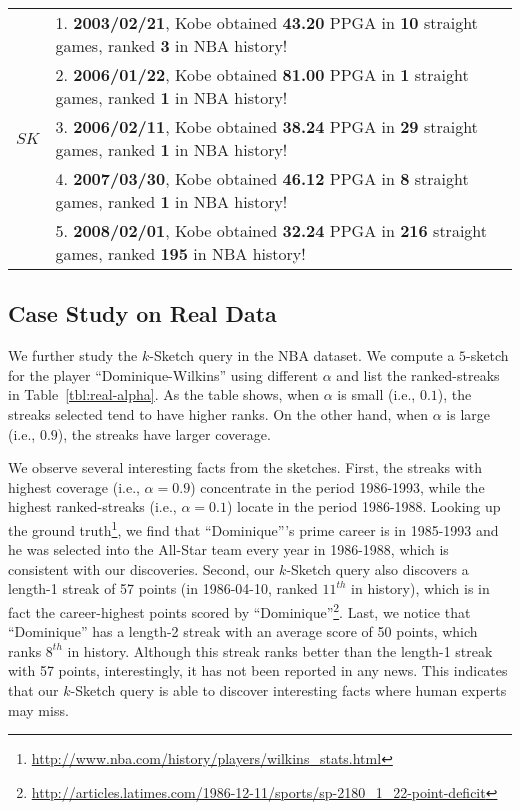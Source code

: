 \begin{table}
\begin{tabular}{|l|p{12cm}|}
\multirow{5}{0.5cm}{$SK$}  &1. \textbf{2003/02/21}, Kobe obtained \textbf{43.20} PPGA in \textbf{10} straight games, ranked \textbf{3} in NBA history!    \\ %
                         &2. \textbf{2006/01/22}, Kobe obtained \textbf{81.00} PPGA in \textbf{1} straight games, ranked \textbf{1} in NBA history!     \\ %
                      	 &3. \textbf{2006/02/11}, Kobe obtained \textbf{38.24} PPGA in \textbf{29} straight games, ranked \textbf{1} in NBA history! \\ %
                         &4. \textbf{2007/03/30}, Kobe obtained \textbf{46.12} PPGA in \textbf{8} straight games, ranked \textbf{1} in NBA history!     
\\ %
					&5. \textbf{2008/02/01}, Kobe obtained \textbf{32.24} PPGA in \textbf{216} straight games, ranked \textbf{195} in NBA history!
\\\hline
\end{tabular}

\end{table}

\subsection{Case Study on Real Data}
We further study the $k$-Sketch query in the NBA dataset.
We compute a $5$-sketch for the player ``Dominique-Wilkins'' using different $\alpha$
and list the ranked-streaks in Table~\ref{tbl:real-alpha}. 
As the table shows, when $\alpha$ is small (i.e., $0.1$), 
the streaks selected tend to have higher ranks.
On the other hand, when $\alpha$ is large (i.e., $0.9$), the streaks have larger coverage.

We observe several interesting facts from the sketches. 
First, the streaks with highest coverage (i.e., $\alpha = 0.9$)
concentrate in the period 1986-1993, while the highest ranked-streaks (i.e., $\alpha = 0.1$) locate in the period 1986-1988. Looking
up the ground truth\footnote{\url{http://www.nba.com/history/players/wilkins_stats.html}}, 
we find that ``Dominique'''s prime career is in 1985-1993 and he was selected
into the All-Star team every year in 1986-1988, which is consistent with our discoveries.
Second, our $k$-Sketch query also discovers a length-1 streak of 57 points (in 1986-04-10, ranked $11^{th}$ in history), 
which is in fact the career-highest points scored by ``Dominique''\footnote{\url{http://articles.latimes.com/1986-12-11/sports/sp-2180_1_22-point-deficit}}.
Last, we notice that ``Dominique'' has a length-2 streak with an average score of 50 points, which ranks $8^{th}$ in history. 
Although this streak ranks better than the length-1 streak with 57 points, 
interestingly, it has not been reported in any news. This indicates that our $k$-Sketch query is able 
to discover interesting facts where human experts may miss.

